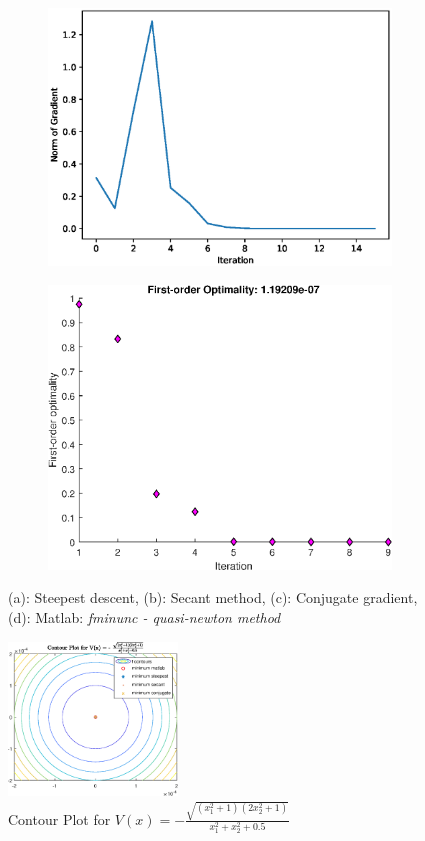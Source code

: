 \begin{figure}[h!]
\begin{subfigure}[t]{0.4\textwidth}
    \includegraphics[width=\textwidth]{images/python/cg-pB.eps}
    \caption{}
    \label{fig:TSNE}
\end{subfigure}
\hfill
\begin{subfigure}[t]{0.4\textwidth}
\centering
    \includegraphics[width=\textwidth]{images/matlab/1b_loss.eps}
    \caption{}
    \label{fig:TSNE}
\end{subfigure}
\caption{(a): Steepest descent, (b): Secant method, (c): Conjugate gradient, (d): Matlab: \textit{fminunc - quasi-newton method}}
\end{figure}
\begin{figure}
    \centering
    \includegraphics[width=0.4\textwidth]{images/matlab/matlab_1b.eps}
    \caption{Contour Plot for $V(x) = - \frac{\sqrt{(x_1^2 +1)(2x_2^2 + 1)}}{x_1^2 + x_2^2 + 0.5}$ }
\end{figure}